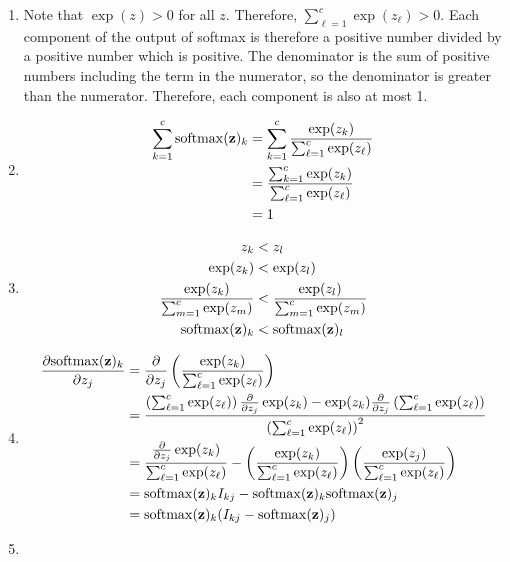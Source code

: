 \documentclass[submit]{harvardml}
\begin{document}
\begin{solution}
\begin{sol}
\begin{enumerate}
\item Note that $\exp(z) > 0$ for all $z$. Therefore, $\sum_{\ell=1}^c \exp(z_{\ell}) > 0$.
Each component of the output of softmax is therefore a positive number divided by a positive number which is positive.
The denominator is the sum of positive numbers including the term in the numerator, so the denominator is greater than the numerator.
Therefore, each component is also at most 1.
%
\item
\begin{align*}
\sum_{k=1}^{c} {\mathrm{softmax}(\mathbf{z})_k} &= \sum_{k=1}^{c} \frac{\exp(z_k)}{\sum_{\ell=1}^c \exp(z_{\ell})}\\
&= \frac{\sum_{k=1}^{c} \exp(z_k)}{\sum_{\ell=1}^c \exp(z_{\ell})}\\
&= 1
\end{align*}
%
\item
\begin{align*}
z_k &< z_l\\
\exp(z_k) &< \exp(z_l)\\
\frac{\exp(z_k)}{\sum_{m=1}^c \exp(z_{m})} &< \frac{\exp(z_l)}{\sum_{m=1}^c \exp(z_{m})}\\
\mathrm{softmax}(\mathbf{z})_k &< {\mathrm{softmax}(\mathbf{z})_l}
\end{align*}
%
\item
\begin{align*}
\frac{\partial \mathrm{softmax}(\mathbf{z})_k }{\partial z_j} &= \frac{\partial}{\partial z_j} \left( \frac{\exp(z_k)}{\sum_{\ell=1}^c \exp(z_{\ell})} \right)\\
&= \frac{ \left(\sum_{\ell=1}^c \exp(z_{\ell})\right) \frac{\partial}{\partial z_j} \exp(z_k)
- \exp(z_k) \frac{\partial}{\partial z_j} \left( \sum_{\ell=1}^c \exp(z_{\ell}) \right)}
{ \left( \sum_{\ell=1}^c \exp(z_{\ell}) \right)^2}\\
&= \frac{\frac{\partial}{\partial z_j} \exp(z_k)}{\sum_{\ell=1}^c \exp(z_{\ell})}
- \left(\frac{\exp(z_k)}{\sum_{\ell=1}^c \exp(z_{\ell})}\right)
\left(\frac{\exp(z_j)}{\sum_{\ell=1}^c \exp(z_{\ell})}\right)\\
&= \mathrm{softmax}(\mathbf{z})_k I_{kj} - \mathrm{softmax}(\mathbf{z})_k \mathrm{softmax}(\mathbf{z})_j\\
&= \mathrm{softmax}(\mathbf{z})_k (I_{kj} - \mathrm{softmax}(\mathbf{z})_j)
\end{align*}
%
\item

\end{enumerate}
\end{sol}
\end{solution}
\end{document}
